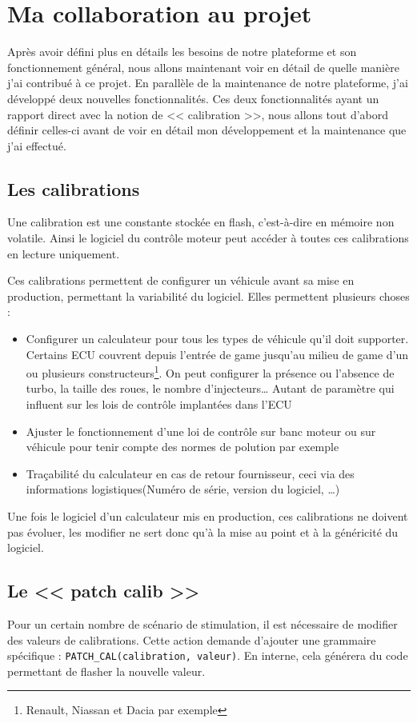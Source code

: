 \chapter{Ma collaboration au projet}\label{collab}
\putminitoc
Après avoir défini plus en détails les besoins de notre plateforme et son fonctionnement général, nous allons maintenant voir en détail de quelle manière j'ai contribué à ce projet. En parallèle de la maintenance de notre plateforme, j'ai développé deux nouvelles fonctionnalités. Ces deux fonctionnalités ayant un rapport direct avec la notion de << calibration >>, nous allons tout d'abord définir celles-ci avant de voir en détail mon développement et la maintenance que j'ai effectué.

\section{Les calibrations}
Une calibration est une constante stockée en flash, c'est-à-dire en mémoire non volatile. Ainsi le logiciel du contrôle moteur peut accéder à toutes ces calibrations en lecture uniquement.

Ces calibrations permettent de configurer un véhicule avant sa mise en production, permettant la variabilité du logiciel. Elles permettent plusieurs choses : 
\begin{itemize}
	\item Configurer un calculateur pour tous les types de véhicule qu'il doit supporter. Certains ECU couvrent depuis l'entrée de game jusqu'au milieu de game d'un ou plusieurs constructeurs\footnote{Renault, Niassan et Dacia par exemple}. On peut configurer la présence ou l'absence de turbo, la taille des roues, le nombre d'injecteurs\ldots
	 Autant de paramètre qui influent sur les lois de contrôle implantées dans l'ECU
	\item Ajuster le fonctionnement d'une loi de contrôle sur banc moteur ou sur véhicule pour tenir compte des normes de polution par exemple
	\item Traçabilité du calculateur en cas de retour fournisseur, ceci via des informations logistiques(Numéro de série, version du logiciel, \ldots)
\end{itemize}

Une fois le logiciel d'un calculateur mis en production, ces calibrations ne doivent pas évoluer, les modifier ne sert donc qu'à la mise au point et à la généricité du logiciel.
\vfill
\section{Le << patch calib >>}\label{patch}
Pour un certain nombre de scénario de stimulation, il est nécessaire de modifier des valeurs de calibrations. Cette action demande d'ajouter une grammaire spécifique : \texttt{PATCH\_CAL(calibration, valeur)}. En interne, cela générera du code permettant de flasher la nouvelle valeur.
%
